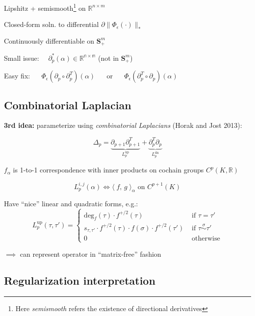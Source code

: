 \documentclass[
  letterpaper,
  DIV=11,
  numbers=noendperiod,
  oneside]{scrartcl}
\begin{document}
Lipshitz + semismooth\footnote{Here \emph{semismooth} refers the
  existence of directional derivatives} on \(\mathbb{R}^{n \times m}\)

Closed-form soln. to differential
\(\partial \lVert \Phi_\epsilon(\cdot) \rVert_\ast\)

Continuously differentiable on \(\mathbf{S}_+^m\)

Small issue:
\(\quad \partial_p^\ast(\alpha) \in \mathbb{R^{n \times m}}\) (not in
\(\mathbf{S}_+^m\))

Easy fix: \(\quad\)
\(\Phi_\epsilon(\partial_p \circ \partial_p^T)(\alpha)\) \(\quad\) or
\(\quad\) \(\Phi_\epsilon(\partial_p^T \circ \partial_p)(\alpha)\)

\hypertarget{combinatorial-laplacian}{%
\subsection{Combinatorial Laplacian}\label{combinatorial-laplacian}}

\textbf{3rd idea:} parameterize using \emph{combinatorial Laplacians}
(Horak and Jost 2013):

\[ \Delta_p = \underbrace{\partial_{p+1} \partial_{p+1}^T}_{L_p^{\mathrm{up}}}  + \underbrace{\partial_{p}^T \partial_{p}}_{L_p^{\mathrm{dn}}} \]

\(f_\alpha\) is 1-to-1 correspondence with inner products on cochain
groups \(C^p(K, \mathbb{R})\)

\[L_p^{i,j}(\alpha) \Leftrightarrow \langle \; f,\, g \; \rangle_{\alpha} \text{ on } C^{p+1}(K)\]

Have ``nice'' linear and quadratic forms, e.g.: \[
L_p^{\text{up}}(\tau, \tau')= \begin{cases}
         \mathrm{deg}_f(\tau) \cdot f^{+/2}(\tau) & \text{ if } \tau = \tau' \\ 
        s_{\tau, \tau'} \cdot  f^{+/2}(\tau) \cdot f(\sigma) \cdot f^{+/2}(\tau') & \text{ if } \tau \overset{\sigma}{\sim} \tau' \\
        0 & \text{ otherwise} 
    \end{cases}
\]

\(\implies\) can represent operator in ``matrix-free'' fashion

\hypertarget{regularization-interpretation}{%
\subsection{Regularization
interpretation}\label{regularization-interpretation}}
\end{document}
